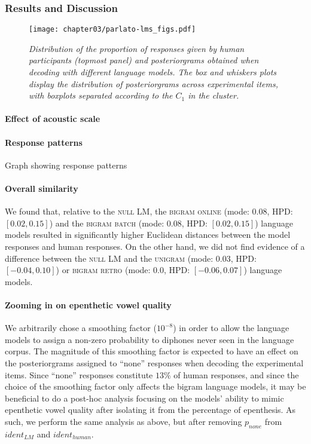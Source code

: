 \subsubsection{Results and Discussion}
\begin{figure}[htb!]
    \centering
    \texttt{[image: chapter03/parlato-lms\_figs.pdf]}
    \caption{\textit{Distribution of the proportion of responses given by human participants (topmost panel) and posteriorgrams obtained when decoding with different language models. The box and whiskers plots display the distribution of posteriorgrams across experimental items, with boxplots separated according to the $C_{1}$ in the cluster.}}
    \label{fig:parlato-lms}
  \end{figure}
  
\paragraph{Effect of acoustic scale}

\paragraph{Response patterns}
{\color{red}Graph showing response patterns}


\paragraph{Overall similarity}
We found that, relative to the \textsc{null} LM, the \textsc{bigram online} (mode: $0.08$, HPD: $[0.02, 0.15]$) and the \textsc{bigram batch} (mode: $0.08$, HPD: $[0.02, 0.15]$) language models resulted in significantly higher Euclidean distances between the model responses and human responses. On the other hand, we did not find evidence of a difference between the \textsc{null} LM and the \textsc{unigram} (mode: $0.03$, HPD: $[-0.04, 0.10]$) or \textsc{bigram retro} (mode: $0.0$, HPD: $[-0.06, 0.07]$) language models.

\paragraph{Zooming in on epenthetic vowel quality}
We arbitrarily chose a smoothing factor ($10^{-8}$)  in order to allow the language models to assign a non-zero probability to diphones never seen in the language corpus. The magnitude of this smoothing factor is expected to have an effect on the posteriorgrams assigned to ``none'' responses when decoding the experimental items. Since ``none'' responses constitute $13\%$ of human responses, and since the choice of the smoothing factor only affects the bigram language models, it may be beneficial to do a post-hoc analysis focusing on the models' ability to mimic epenthetic vowel quality after isolating it from the percentage of epenthesis. As such, we perform the same analysis as above, but after removing $p_{none}$ from $ident_{LM}$ and $ident_{human}$.

